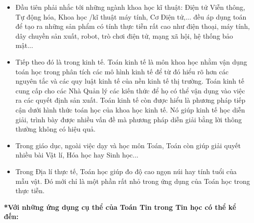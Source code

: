 \documentclass[12pt,a4paper]{report}
\begin{document}
    \begin{itemize}
        \item Đầu tiên phải nhắc tới những ngành khoa học kĩ thuật: Điện tử Viễn thông, Tự động hóa, Khoa học /kĩ thuật máy tính, Cơ Điện tử,... đều áp dụng toán để tạo ra những sản phẩm có tính thực tiễn rất cao như điện thoại, máy tính, dây chuyền sản xuất, robot, trò chơi điện tử, mạng xã hội, hệ thống bảo mật...
        \item Tiếp theo đó là trong kinh tế. Toán kinh tế là môn khoa học nhằm vận dụng toán học trong phân tích các mô hình kinh tế để từ đó hiểu rõ hơn các nguyên tắc và các quy luật kinh tế của nền kinh tế thị trường. Toán kinh tế cung cấp cho các Nhà Quản lý các kiến thức để họ có thể vận dụng vào việc ra các quyết định sản xuất. Toán kinh tế còn được hiểu là phương pháp tiếp cận dưới hình thức toán học của khoa học kinh tế. Nó giúp kinh tế học diễn giải, trình bày được nhiều vấn đề mà phương pháp diễn giải bằng lời thông thường không có hiệu quả. 
        \item Trong giáo dục, ngoài việc dạy và học môn Toán, Toán còn giúp giải quyết nhiều bài Vật lí, Hóa học hay Sinh học...
        \item Trong Địa lí thực tế, Toán học giúp đo độ cao ngọn núi hay tính tuổi của mẫu vật. Đó mới chỉ là một phần rất nhỏ trong ứng dụng của Toán học trong thực tiễn. 
    \end{itemize}
     
    {\textbf{*Với những ứng dụng cụ thể của Toán Tin trong Tin học có thể kể đến:}} \\
    
\end{document}
